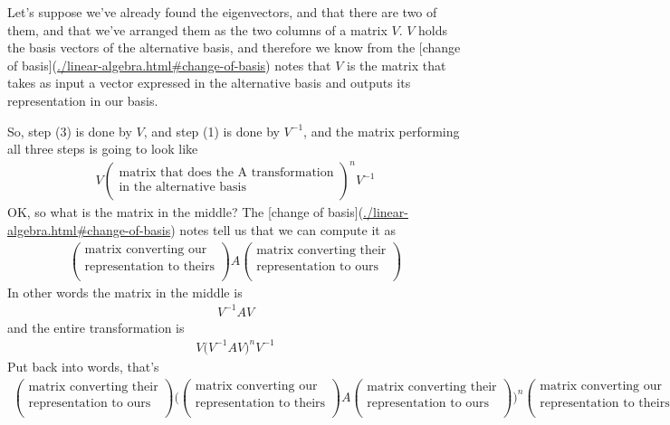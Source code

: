 \begin{lemma}
Let's suppose we've already found the eigenvectors, and that there are two of
them, and that we've arranged them as the two columns of a matrix $V$. $V$ holds
the basis vectors of the alternative basis, and therefore we know from the
[change of basis](\url{./linear-algebra.html#change-of-basis}) notes that $V$ is the
matrix that takes as input a vector expressed in the alternative basis and
outputs its representation in our basis.

So, step (3) is done by $V$, and step (1) is done by $V^{-1}$, and the matrix
performing all three steps is going to look like
\begin{align*}
  V
  \begin{pmatrix}\text{matrix that does the A transformation}\\\text{in the alternative basis} \\ \end{pmatrix}^n
  V^{-1}
\end{align*}
OK, so what is the matrix in the middle? The [change of
basis](\url{./linear-algebra.html#change-of-basis}) notes tell us that we can compute it as
\begin{align*}
  \begin{pmatrix}\text{matrix converting our}\\\text{representation to theirs} \\ \end{pmatrix}
  A
  \begin{pmatrix}\text{matrix converting their}\\\text{representation to ours} \\ \end{pmatrix}
\end{align*}
In other words the matrix in the middle is
\begin{align*}
  V^{-1}AV
\end{align*}
and the entire transformation is
\begin{align*}
  V
  \Big(V^{-1}AV\Big)^n
  V^{-1}
\end{align*}
Put back into words, that's
\begin{align*}
  \begin{pmatrix}\text{matrix converting their}\\\text{representation to ours} \\ \end{pmatrix}
  \Bigg(
  \begin{pmatrix}\text{matrix converting our}\\\text{representation to theirs} \\ \end{pmatrix}
  A
  \begin{pmatrix}\text{matrix converting their}\\\text{representation to ours} \\ \end{pmatrix}
  \Bigg)^n
  \begin{pmatrix}\text{matrix converting our}\\\text{representation to theirs} \\ \end{pmatrix}
\end{align*}


\end{lemma}
